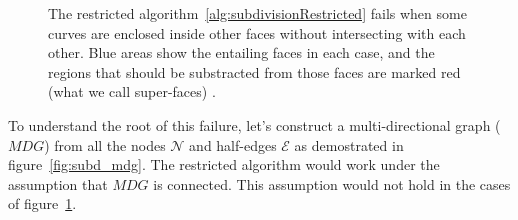 \begin{figure}
\begin{subfigure}{.32\textwidth}
  \end{subfigure}%
  \caption[xxx]
          {The restricted algorithm~\ref{alg:subdivisionRestricted} fails when some curves are enclosed inside other faces without intersecting with each other.
          Blue areas show the entailing faces in each case, and the regions that should be substracted from those faces are marked red (what we call super-faces) .}
  \label{fig:subd_restrictedFail}
\end{figure}

To understand the root of this failure, let's construct a multi-directional graph ($\mathit{MDG}$) from all the nodes $\mathcal{N}$ and half-edges $\mathcal{E}$ as demostrated in figure~\ref{fig:subd_mdg}.
The restricted algorithm would work under the assumption that $\mathit{MDG}$ is connected.
This assumption would not hold in the cases of figure~\ref{fig:subd_restrictedFail}.

